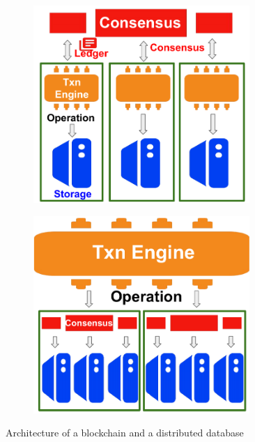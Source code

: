 \begin{figure}[tp]
    \centering
	\begin{subfigure}{0.5\textwidth}
	    \includegraphics[width=0.9\textwidth]{diagram/twin/bc_arch.pdf}
	    \caption{}
	\end{subfigure}%
	\begin{subfigure}{0.5\textwidth}
	    \includegraphics[width=0.9\textwidth]{diagram/twin/db_arch.pdf}
	    \caption{}
	\end{subfigure}%
	\caption{Architecture of a blockchain and a distributed database}
    \label{diagram:twin:arch}
\end{figure}

